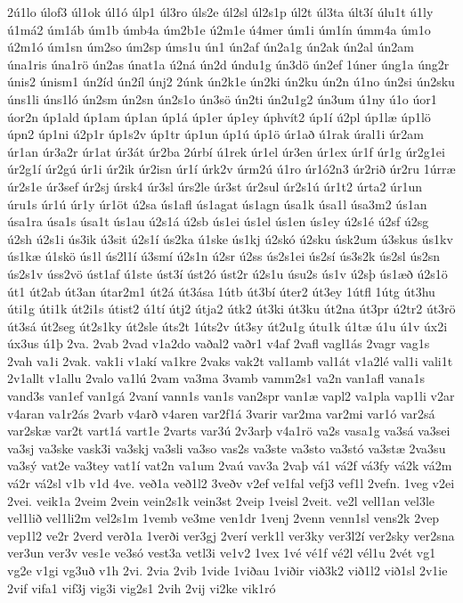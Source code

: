 {2ú1lo
úlof3
úl1ok
úl1ó
úlp1
úl3ro
úls2e
úl2sl
úl2s1p
úl2t
úl3ta
últ3í
úlu1t
ú1ly
ú1má2
úm1áb
úm1b
úmb4a
úm2b1e
ú2m1e
ú4mer
úm1i
úm1ín
úmm4a
úm1o
ú2m1ó
úm1sn
úm2so
úm2sp
úms1u
ún1
ún2af
ún2a1g
ún2ak
ún2al
ún2am
úna1ris
úna1rö
ún2as
únat1a
ú2ná
ún2d
úndu1g
ún3dö
ún2ef
1úner
úng1a
úng2r
únis2
únism1
ún2íd
ún2íl
únj2
2únk
ún2k1e
ún2ki
ún2ku
ún2n
ú1no
ún2si
ún2sku
úns1li
úns1ló
ún2sm
ún2sn
ún2s1o
ún3sö
ún2ti
ún2u1g2
ún3um
ú1ny
ú1o
úor1
úor2n
úp1ald
úp1am
úp1an
úp1á
úp1er
úp1ey
úphvít2
úp1í
ú2pl
úp1læ
úp1lö
úpn2
úp1ni
ú2p1r
úp1s2v
úp1tr
úp1un
úp1ú
úp1ö
úr1að
ú1rak
úral1i
úr2am
úr1an
úr3a2r
úr1at
úr3át
úr2ba
2úrbí
ú1rek
úr1el
úr3en
úr1ex
úr1f
úr1g
úr2g1ei
úr2g1í
úr2gú
úr1i
úr2ik
úr2isn
úr1í
úrk2v
úrm2ú
ú1ro
úr1ó2n3
úr2rið
úr2ru
1úrræ
úr2s1e
úr3sef
úr2sj
úrsk4
úr3sl
úrs2le
úr3st
úr2sul
úr2s1ú
úr1t2
úrta2
úr1un
úru1s
úr1ú
úr1y
úr1öt
ú2sa
ús1afl
ús1agat
ús1agn
úsa1k
úsa1l
úsa3m2
ús1an
úsa1ra
úsa1s
úsa1t
ús1au
ú2s1á
ú2sb
ús1ei
ús1el
ús1en
ús1ey
ú2s1é
ú2sf
ú2sg
ú2sh
ú2s1i
ús3ik
ú3sit
ú2s1í
ús2ka
ú1ske
ús1kj
ú2skó
ú2sku
úsk2um
ú3skus
ús1kv
ús1kæ
ú1skö
ús1l
ús2l1í
ú3smí
ú2s1n
ú2sr
ú2ss
ús2s1ei
ús2sí
ús3s2k
ús2sl
ús2sn
ús2s1v
úss2vö
úst1af
ú1ste
úst3í
úst2ó
úst2r
ú2s1u
úsu2s
ús1v
ú2sþ
ús1æð
ú2s1ö
út1
út2ab
út3an
útar2m1
út2á
út3ása
1útb
út3bí
úter2
út3ey
1útfl
1útg
út3hu
úti1g
úti1k
út2i1s
útist2
ú1tí
útj2
útja2
útk2
út3ki
út3ku
út2na
út3pr
ú2tr2
út3rö
út3sá
út2seg
út2s1ky
út2sle
úts2t
1úts2v
út3sy
út2u1g
útu1k
ú1tæ
ú1u
ú1v
úx2i
úx3us
ú1þ
2va.
2vab
2vad
v1a2do
vaðal2
vaðr1
v4af
2vafl
vagl1ás
2vagr
vag1s
2vah
va1i
2vak.
vak1i
v1akí
va1kre
2vaks
vak2t
val1amb
val1át
v1a2lé
val1i
vali1t
2v1allt
v1allu
2valo
va1lú
2vam
va3ma
3vamb
vamm2s1
va2n
van1afl
vana1s
vand3s
van1ef
van1gá
2vaní
vann1s
van1s
van2spr
van1æ
vapl2
va1pla
vap1li
v2ar
v4aran
va1r2ás
2varb
v4arð
v4aren
var2f1á
3varir
var2ma
var2mi
var1ó
var2sá
var2skæ
var2t
vart1á
vart1e
2varts
var3ú
2v3arþ
v4a1rö
va2s
vasa1g
va3sá
va3sei
va3sj
va3ske
vask3i
va3skj
va3sli
va3so
vas2s
va3ste
va3sto
va3stó
va3stæ
2va3su
va3sý
vat2e
va3tey
vat1í
vat2n
va1um
2vaú
vav3a
2vaþ
vá1
vá2f
vá3fy
vá2k
vá2m
vá2r
vá2sl
v1b
v1d
4ve.
veð1a
veð1l2
3veðv
v2ef
ve1fal
vefj3
vef1l
2vefn.
1veg
v2ei
2vei.
veik1a
2veim
2vein
vein2s1k
vein3st
2veip
1veisl
2veit.
ve2l
vell1an
vel3le
vel1lið
vel1li2m
vel2s1m
1vemb
ve3me
ven1dr
1venj
2venn
venn1sl
vens2k
2vep
vep1l2
ve2r
2verd
verð1a
1verði
ver3gj
2verí
verk1l
ver3ky
ver3l2í
ver2sky
ver2sna
ver3un
ver3v
ves1e
ve3só
vest3a
vetl3i
ve1v2
1vex
1vé
vé1f
vé2l
vél1u
2vét
vg1
vg2e
v1gi
vg3uð
v1h
2vi.
2via
2vib
1vide
1viðau
1viðir
við3k2
við1l2
við1sl
2v1ie
2vif
vifa1
vif3j
vig3i
vig2s1
2vih
2vij
vi2ke
vik1ró
}
